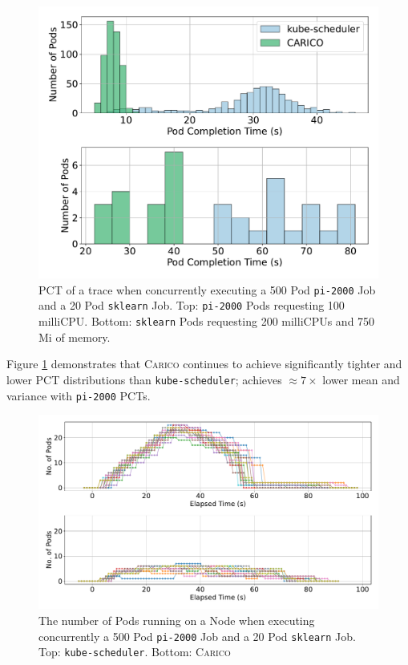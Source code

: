 \begin{figure}[ht!]
    \centering
    \includegraphics[width=\textwidth]{images/mixed-pod-completion.pdf}
    \caption{PCT of a trace when concurrently executing a 500 Pod
    \texttt{pi-2000} Job and a 20 Pod \texttt{sklearn} Job. Top:
    \texttt{pi-2000} Pods requesting 100 milliCPU. Bottom: \texttt{sklearn} Pods
    requesting 200 milliCPUs and 750 Mi of memory.}
    \label{fig:mixed-pod-completion}
\end{figure}

Figure \ref{fig:mixed-pod-completion} demonstrates that \textsc{Carico}
continues to achieve significantly tighter and lower PCT distributions than
\texttt{kube-scheduler}; achieves $\approx 7 \times$ lower mean and variance with
\texttt{pi-2000} PCTs.


\begin{figure}[ht!]
    \centering
    \includegraphics[width=\textwidth]{images/mixed-running-pods.pdf}
    \caption{The number of Pods running on a Node when executing concurrently a
    500 Pod \texttt{pi-2000} Job and a 20 Pod \texttt{sklearn} Job. Top:
    \texttt{kube-scheduler}. Bottom: \textsc{Carico}}
    \label{fig:mixed-pod-running}
\end{figure}


